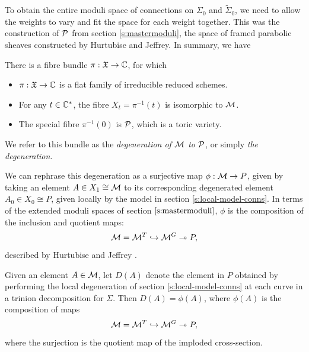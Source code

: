 	To obtain the entire moduli space of connections on $\Sigma_0$ and $\tilde{\Sigma}_0$, we need to allow the weights to vary and fit the space for each weight together. This was the construction of $\mathcal{P}$ from section \ref{s:mastermoduli}, the space of framed parabolic sheaves constructed by Hurtubise and Jeffrey. In summary, we have \cite[Theorems 3.17, 4.1]{biswas_degenerations_2021}
	\begin{theorem}
		\label{t:bishurt}
		There is a fibre bundle $\pi: \mathfrak{X} \to \mathbb{C}$, for which
		\begin{itemize}
			\item $\pi:\mathfrak{X}\to \mathbb{C}$ is a flat family of irreducible reduced schemes.
			\item For any $t\in \mathbb{C}^\ast$, the fibre $X_t = \pi^{-1}(t)$ is isomorphic to $\mathcal{M}$.
			\item The special fibre $\pi^{-1}(0)$ is $\mathcal{P}$, which is a toric variety.
		\end{itemize}
		We refer to this bundle as the \emph{degeneration of $\mathcal{M}$ to $\mathcal{P}$}, or simply \emph{the degeneration}.
	\end{theorem}
	We can rephrase this degeneration as a surjective map $\phi:\mathcal{M}\to P$, given by taking an element $A\in X_1 \cong \mathcal{M}$ to its corresponding degenerated element $A_0 \in X_0 \cong P$, given locally by the model in section \ref{s:local-model-conns}. In terms of the extended moduli spaces of section $\ref{s:mastermoduli}$, $\phi$ is the composition of the inclusion and quotient maps:
	\begin{equation}
		\mathcal{M} = \mathcal{M}^T \hookrightarrow \mathcal{M}^G \twoheadrightarrow P,
	\end{equation}
	described by Hurtubise and Jeffrey \cite[prop 2.37]{hurtubise_representations_2000}. 
	\begin{lemma}
		Given an element $A\in \mathcal{M}$, let $D(A)$ denote the element in $P$ obtained by performing the local degeneration of section \ref{s:local-model-conns} at each curve in a trinion decomposition for $\Sigma$. Then $D(A) = \phi(A)$, where $\phi(A)$ is the composition of maps 
		\begin{equation}
			\mathcal{M} = \mathcal{M}^T \hookrightarrow \mathcal{M}^G \twoheadrightarrow P,
		\end{equation}
		where the surjection is the quotient map of the imploded cross-section.
	\end{lemma}
